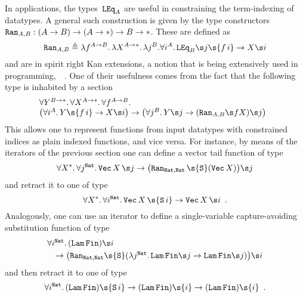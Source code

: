 In applications, the types~$\mathtt{LEq}_A$ are useful in constraining the
term-indexing of datatypes. %
A general such construction is given by the type constructors $\mathtt{Ran}_{A,B}:
(A\to B) \to (A\to*) \to B\to *$.  These are defined as 
\[
\Ran_{A,B}
\triangleq
\l f^{A\to B}.\,
  \l X^{A\to*}.\,
    \l j^B.
      \forall i^A.\,
        \LEq_B \s j \s{f\,i}
	  \to X\s i
\]
and are in spirit right Kan extensions, a notion that is being extensively
used in programming,~\eg~\cite{AbeMatUus05,JohannGhani08}. %
%
One of their usefulness comes from the fact that the following type
is inhabited by a section
\[
\!\!\!
\begin{array}{l}
\forall Y^{B\to*}.\,\forall X^{A\to*}.\,\forall f^{A\to B}.\,
\\
\big(\forall i^A.\,Y\s{f\,i}\to X\s i\big)
\to
\big(\forall j^B.\,Y\s j\to (\Ran_{A,B}\s f X)\s j\big)
\end{array}\]
This allows one to represent functions from input datatypes with
constrained indices as plain indexed functions, and vice versa.  For
instance, by means of the iterators of the previous section one can define
a vector tail function of type 
\[
\forall X^{*}.\,\forall j^{\mathtt{Nat}}.\,\mathtt{Vec}\, X\, \s j \to
\big(\Ran_{\mathtt{Nat},\mathtt{Nat}}\,\s{\mathtt S}(\mathtt{Vec}\,
X)\big)\s j 
\]
and retract it to one of type
\[
\forall X^{*}.\,\forall i^{\mathtt{Nat}}.\,\mathtt{Vec}\, X\, \s{\mathtt
S\, i} \to \mathtt{Vec}\, X\,\s i
\enspace.
\]
%
Analogously, one can use an iterator to define a single-variable
capture-avoiding substitution function of type
\[\begin{array}{l}
\forall i^{\mathtt{Nat}}.\,
(\mathtt{Lam}\,\mathtt{Fin})\s i
\\[1mm]
\quad
\to
\big(\Ran_{\mathtt{Nat},\mathtt{Nat}}
\s{\mathtt S}
(\lambda j^{\mathtt{Nat}}.\,
\mathtt{Lam}\,\mathtt{Fin}\s j
\to
\mathtt{Lam}\,\mathtt{Fin}\s j)\big)
\s i
\end{array}\]
and then retract it to one of type 
\[
\forall i^{\mathtt{Nat}}.\,
(\mathtt{Lam}\,\mathtt{Fin})\s{\mathtt S\, i}
\to
(\mathtt{Lam}\,\mathtt{Fin})\s{i}
\to
(\mathtt{Lam}\,\mathtt{Fin})\s{i}
\enspace.
\]

